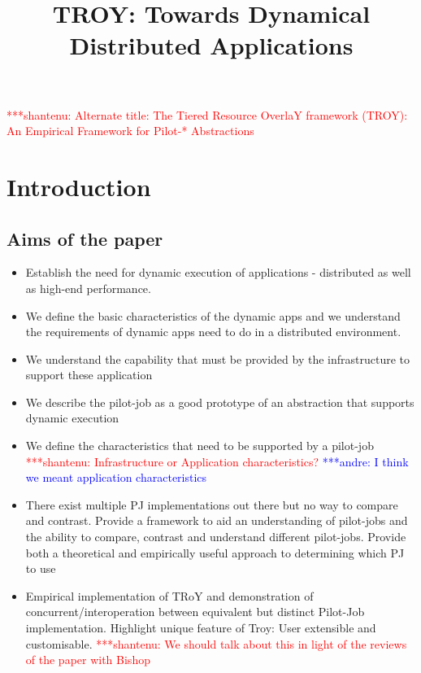 \documentclass[]{article}
\title{TROY: Towards Dynamical Distributed Applications}
\author{  }
\newcommand{\jhanote}[1]{ {\textcolor{red} { ***shantenu: #1 }}}
\newcommand{\alnote}[1]{ {\textcolor{blue} { ***andre: #1 }}}
\newcommand{\alnote}[1]{}
\begin{document}
\ifpdf
{}
\else
{}
\fi

\maketitle

\jhanote{Alternate title: The Tiered Resource OverlaY framework
  (TROY): An Empirical Framework for Pilot-* Abstractions}


\begin{abstract}

\end{abstract}

\section{Introduction}
\subsection{Aims of the paper}
\begin{itemize}

\item Establish the need for dynamic execution of applications -
  distributed as well as high-end performance.

\item We define the basic characteristics of the dynamic apps and we
  understand the requirements of dynamic apps need to do in a
  distributed environment.

\item We understand the capability that must be provided by the
  infrastructure to support these application

\item We describe the pilot-job as a good prototype of an abstraction
  that supports dynamic execution

\item We define the characteristics that need to be supported by a
  pilot-job \jhanote{Infrastructure or Application characteristics?}
  \alnote{I think we meant application characteristics}

\item There exist multiple PJ implementations out there but no way to
  compare and contrast. Provide a framework to aid an understanding of
  pilot-jobs and the ability to compare, contrast and understand
  different pilot-jobs.  Provide both a theoretical and empirically
  useful approach to determining which PJ to use


\item Empirical implementation of TRoY and demonstration of
  concurrent/interoperation between equivalent but distinct Pilot-Job
  implementation. Highlight unique feature of Troy: User extensible
  and customisable. \jhanote{We should talk about this in light of the
    reviews of the paper with Bishop}
\end{itemize}
\end{document}
